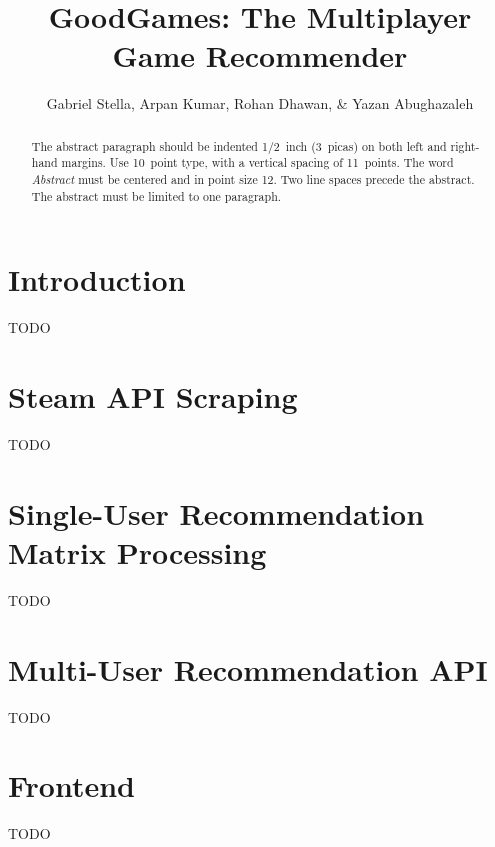 \documentclass{article} %
\title{GoodGames: The Multiplayer Game Recommender}
\author{Gabriel Stella, Arpan Kumar, Rohan Dhawan, \& Yazan Abughazaleh}
\begin{document}
\ifcolmsubmission
\linenumbers
\fi

\maketitle

\begin{abstract}
The abstract paragraph should be indented 1/2~inch (3~picas) on both left and
right-hand margins. Use 10~point type, with a vertical spacing of 11~points.
The word \textit{Abstract} must be centered and in point size 12. Two
line spaces precede the abstract. The abstract must be limited to one
paragraph.
\end{abstract}

\section{Introduction}

TODO

\section{Steam API Scraping}

TODO

\section{Single-User Recommendation Matrix Processing}

TODO

\section{Multi-User Recommendation API}

TODO

\section{Frontend}

TODO
  
\end{document}

